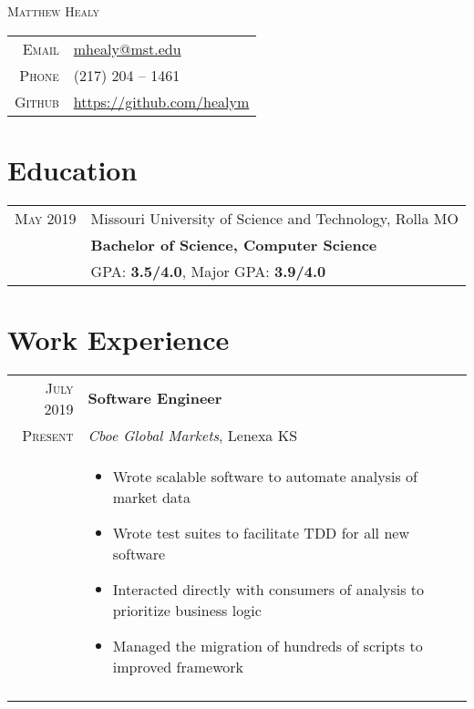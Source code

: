 \documentclass[a4paper,10pt]{article}
\newcommand{\br}{\\\multicolumn{2}{c}{}}
\begin{document}
\pagestyle{empty}

\par{\centering
    {\Huge \textsc{Matthew Healy}
}\bigskip\par}

\begin{center}
\begin{tabular}{rl}
    \textsc{Email } & \href{mailto:mhealy@mst.edu}{mhealy@mst.edu} \\
    \textsc{Phone }        & (217) 204 -- 1461  \\
    \textsc{Github }       & \url{https://github.com/healym} \\
\end{tabular}
\end{center}

\section{Education}
\begin{tabular}{r|p{15cm}}
    \textsc{May} 2019 & Missouri University of Science and Technology, Rolla MO  \\
                      & \textbf{Bachelor of Science, Computer Science} \\
                      & GPA: \textbf{3.5/4.0}, Major GPA: \textbf{3.9/4.0} \\
\end{tabular}


\section{Work Experience}

\begin{tabular}{r|p{15cm}}
    \textsc{July 2019} & \textbf{Software Engineer} \\
    \textsc{Present}  & \textit{Cboe Global Markets}, Lenexa KS \\ &
    \begin{itemize}
    \item Wrote scalable software to automate analysis of market data
    \item Wrote test suites to facilitate TDD for all new software
    \item Interacted directly with consumers of analysis to prioritize business logic
    \item Managed the migration of hundreds of scripts to improved framework

    \end{itemize} \br\\

\end{tabular}
\end{document}
